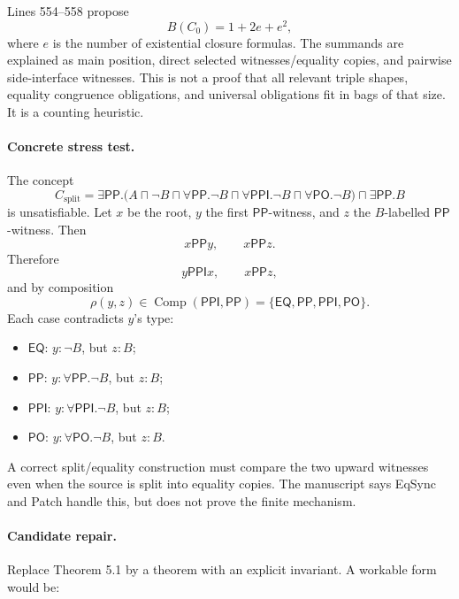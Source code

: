 \documentclass[11pt]{article}
\newcommand{\EQ}{\mathsf{EQ}}
\newcommand{\PP}{\mathsf{PP}}
\newcommand{\PPI}{\mathsf{PPI}}
\newcommand{\PO}{\mathsf{PO}}
\newcommand{\Comp}{\operatorname{Comp}}
\begin{document}
Lines 554--558 propose
\[
  B(C_0)=1+2e+e^2,
\]
where $e$ is the number of existential closure formulas.  The summands are explained as main position, direct selected witnesses/equality copies, and pairwise side-interface witnesses.  This is not a proof that all relevant triple shapes, equality congruence obligations, and universal obligations fit in bags of that size.  It is a counting heuristic.

\paragraph{Concrete stress test.}
The concept
\[
C_{\mathrm{split}}
=
\exists\PP.\bigl(A\sqcap\neg B
      \sqcap \forall\PP.\neg B
      \sqcap \forall\PPI.\neg B
      \sqcap \forall\PO.\neg B\bigr)
\sqcap
\exists\PP.B
\]
is unsatisfiable.  Let $x$ be the root, $y$ the first $\PP$-witness, and $z$ the $B$-labelled $\PP$-witness.  Then
\[
  x\PP y, \qquad x\PP z.
\]
Therefore
\[
  y\PPI x, \qquad x\PP z,
\]
and by composition
\[
  \rho(y,z)\in\Comp(\PPI,\PP)=\{\EQ,\PP,\PPI,\PO\}.
\]
Each case contradicts $y$'s type:
\begin{itemize}[leftmargin=2em]
\item $\EQ$: $y:\neg B$, but $z:B$;
\item $\PP$: $y:\forall\PP.\neg B$, but $z:B$;
\item $\PPI$: $y:\forall\PPI.\neg B$, but $z:B$;
\item $\PO$: $y:\forall\PO.\neg B$, but $z:B$.
\end{itemize}
A correct split/equality construction must compare the two upward witnesses even when the source is split into equality copies.  The manuscript says \textsf{EqSync} and \textsf{Patch} handle this, but does not prove the finite mechanism.

\paragraph{Candidate repair.}
Replace Theorem 5.1 by a theorem with an explicit invariant.  A workable form would be:
\end{document}
